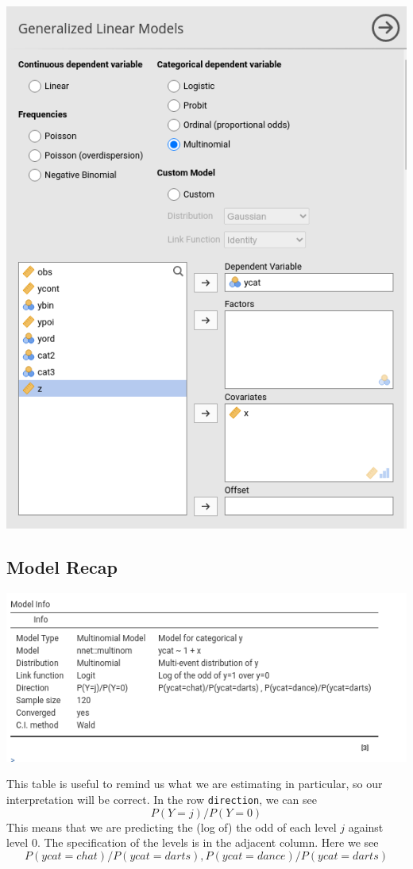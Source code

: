 \documentclass[
]{book}
\begin{document}
\includegraphics{bookletpics/3_multi_input1.png}

\hypertarget{model-recap-1}{%
\subsection{Model Recap}\label{model-recap-1}}

\includegraphics{bookletpics/3_multi_output2.png}

This table is useful to remind us what we are estimating in particular, so our interpretation will be correct. In the row \texttt{direction}, we can see
\[
P(Y=j)/P(Y=0)
\]
This means that we are predicting the (log of) the odd of each level \(j\) against level 0. The specification of the levels is in the adjacent column. Here we see
\[
P(ycat=chat)/P(ycat=darts), P(ycat=dance)/P(ycat=darts) 
\]
\end{document}
